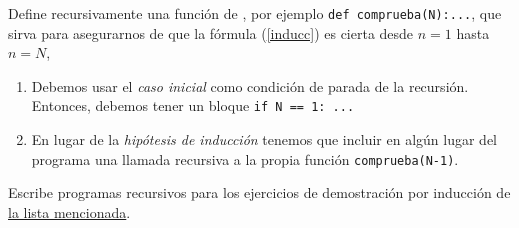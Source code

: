 \begin{enumerate}
{\sc Define recursivamente}  una funci\'on de {\sage}, por ejemplo
\lstinline|def comprueba(N):...|,  que sirva para asegurarnos de que la
f\'ormula (\ref{inducc}) es cierta desde $n=1$ hasta $n=N$, 

\begin{enumerate}
\item Debemos usar el {\itshape caso inicial} como condici\'on de parada de la
recursi\'on. Entonces, debemos tener un bloque \lstinline|if N == 1: ...| 
\item En lugar de la {\itshape hip\'otesis de inducci\'on} tenemos que incluir
en alg\'un lugar del 
programa una llamada recursiva a la propia funci\'on
\lstinline|comprueba(N-1)|.
\end{enumerate}


{\sc Escribe programas recursivos} para los ejercicios de demostraci\'on por
inducci\'on de \hyperref[rec]{la lista mencionada}.





\end{enumerate}



